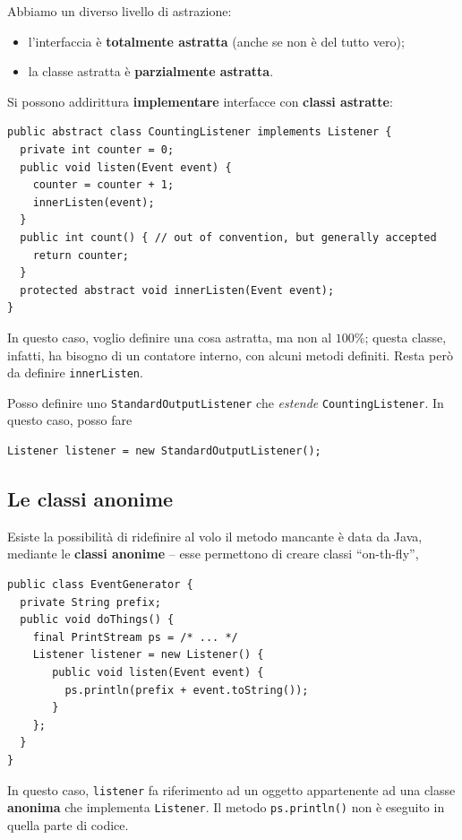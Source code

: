 \documentclass[\fontsizeclass,twocolumn]{\classname}
\theoremstyle{definition}
\theoremstyle{definition}
\begin{document}
Abbiamo un diverso livello di astrazione:
\begin{itemize}
    \item l'interfaccia è \textbf{totalmente astratta} (anche se non è del
        tutto vero);
    \item la classe astratta è \textbf{parzialmente astratta}.
\end{itemize}

Si possono addirittura \textbf{implementare} interfacce con \textbf{classi
astratte}:

\begin{lstlisting}
public abstract class CountingListener implements Listener {
  private int counter = 0;
  public void listen(Event event) {
    counter = counter + 1;
    innerListen(event);
  }
  public int count() { // out of convention, but generally accepted
    return counter;
  }
  protected abstract void innerListen(Event event);
}
\end{lstlisting}


In questo caso, voglio definire una cosa astratta, ma non al $100\%$; questa
classe, infatti, ha bisogno di un contatore interno, con alcuni metodi
definiti. Resta però da definire \texttt{innerListen}.

Posso definire uno \texttt{StandardOutputListener} che \emph{estende} \texttt{CountingListener}. In questo caso, posso fare 


\begin{lstlisting}
Listener listener = new StandardOutputListener();
\end{lstlisting}

\subsection{Le classi anonime}

Esiste la possibilità di ridefinire al volo il metodo mancante è data da Java,
mediante le \textbf{classi anonime} -- esse permettono di creare classi
``on\--th\--fly'',

\begin{lstlisting}
public class EventGenerator {
  private String prefix;
  public void doThings() {
    final PrintStream ps = /* ... */
    Listener listener = new Listener() {
       public void listen(Event event) {
         ps.println(prefix + event.toString());
       }
    };
  }
}
\end{lstlisting}

In questo caso, \texttt{listener} fa riferimento ad un oggetto appartenente ad
una classe \textbf{anonima} che implementa \texttt{Listener}. Il metodo
\texttt{ps.println()} non è eseguito in quella parte di codice.
\end{document}

